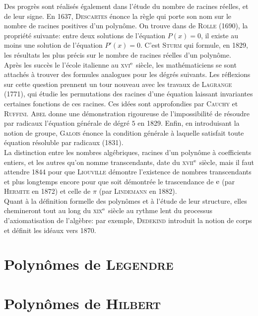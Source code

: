 {Des progrès sont réalisés également dans l'étude du nombre de racines réelles, et de leur signe. En 1637, \textsc{Descartes} énonce la règle qui porte son nom sur le nombre de racines positives d'un polynôme. On trouve dans  de \textsc{Rolle} (1690), la propriété suivante: entre deux solutions de l'équation $P(x)=0$, il existe au moins une solution de l'équation $P'(x)=0$. C'est \textsc{Sturm} qui formule, en 1829, les résultats les plus précis sur le nombre de racines réelles d'un polynôme. \\
Après les succès le l'école italienne au \textsc{xvi}$^{\mathrm{e}}$ siècle, les mathématiciens se sont attachés à trouver des formules analogues pour les dégrés suivants. Les réflexions sur cette question prennent un tour nouveau avec les travaux de \textsc{Lagrange} (1771), qui étudie les permutations des racines d'une équation laissant invariantes certaines fonctions de ces racines. Ces idées sont approfondies par \textsc{Cauchy} et \textsc{Ruffini}. \textsc{Abel} donne une démonstration rigoureuse de l'impossibilité de résoudre par radicaux l'équation générale de dégré $5$ en 1829. Enfin, en introduisant la notion de groupe, \textsc{Galois} énonce la condition générale à laquelle satisfait toute équation résoluble par radicaux (1831). \\
La distinction entre les nombres algébriques, racines d'un polynôme à coefficients entiers, et les autres qu'on nomme transcendants, date du \textsc{xvii}$^{\mathrm{e}}$ siècle, mais il faut attendre 1844 pour que \textsc{Liouville} démontre l'existence de nombres transcendants et plus longtemps encore pour que soit démontrée le trascendance de $\mathrm{e}$ (par \textsc{Hermite} en 1872) et celle de $\pi$ (par \textsc{Lindemann} en 1882). \\
Quant à la définition formelle des polynômes et à l'étude de leur structure, elles chemineront tout au long du \textsc{xix}$^{\mathrm{e}}$ siècle au rythme lent du processus d'axiomatisation de l'algèbre: par exemple, \textsc{Dedekind} introduit la notion de corps et définit les idéaux vers 1870.
}

\newpage

\section{Polynômes de \textsc{Legendre}}


\section{Polynômes de \textsc{Hilbert}}


